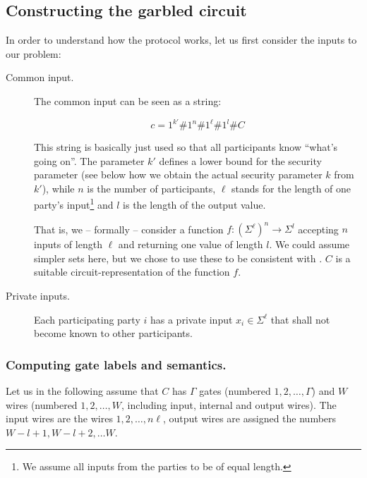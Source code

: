 \message{ !name(seminar.tex)}\documentclass{llncs}
\newcommand{\todo}[1]{ {\color{red}{\textbf{#1}}}}
\begin{document}
\subsection{Constructing the garbled circuit}
\label{sec:protocol-construct-garbled-circuit}

In order to understand how the protocol works, let us first consider the inputs to our problem:

\begin{description}
\item[Common input.] The common input can be seen as a string:

  \begin{equation*}
    c=1^{k'}\#1^n\#1^\ell\#1^l
    \#C
  \end{equation*}

This string is basically just used so that all participants know ``what's going on''. The parameter $k'$ defines a lower bound for the security parameter (see below how we obtain the actual security parameter $k$ from $k'$), while $n$ is the number of participants, $\ell$ stands for the length of one party's input\footnote{We assume all inputs from the parties to be of equal length.} and $l$ is the length of the output value.

That is, we -- formally -- consider a function $f:(\Sigma^\ell)^n\rightarrow \Sigma^l$ accepting $n$ inputs of length $\ell$ and returning one value of length $l$. We could assume simpler sets here, but we chose to use these to be consistent with \cite{Rogaway:1991:RCS:888502}. $C$ is a suitable circuit-representation of the function $f$. 


\item[Private inputs.] Each participating party $i$ has a private input $x_i\in\Sigma ^\ell$ that shall not become known to other participants.
\end{description}

\subsubsection{Computing gate labels and semantics.}
\label{sec:gate-labels-and-semantics-formal-def}

Let us in the following assume that $C$ has $\Gamma$ gates (numbered $1,2,\dots,\Gamma$) and $W$ wires (numbered $1,2,\dots,W$, including input, internal and output wires). The input wires are the wires $1,2,\dots,n\ell$, output wires are assigned the numbers $W-l+1,W-l+2,\dots W$.
\end{document}
